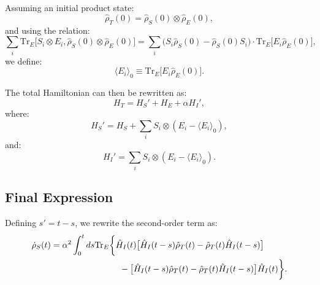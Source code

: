 Assuming an initial product state:
\begin{equation}
    \hat{\rho}_T(0) = \hat{\rho}_S(0) \otimes \hat{\rho}_E(0),
    \label{eq:Initial_Product_State}
\end{equation}
and using the relation:
\begin{equation}
    \sum_i \mathrm{Tr}_E\big[ S_i \otimes E_i , \hat{\rho}_S(0) \otimes \hat{\rho}_E(0)\big] = \sum_i \big(S_i \hat{\rho}_S(0) - \hat{\rho}_S(0) S_i\big) \cdot \mathrm{Tr}_E \big[E_i \hat{\rho}_E(0)\big],
    \label{eq:Trace_Relation}
\end{equation}
we define:
\begin{equation}
    \langle E_i \rangle_0 \equiv \mathrm{Tr}_E \big[E_i \hat{\rho}_E(0)\big].
    \label{eq:Environment_Expectation_Value}
\end{equation}

The total Hamiltonian can then be rewritten as:
\begin{equation}
    H_T = H_S' + H_E + \alpha H_I',
    \label{eq:Shifted_Total_Hamiltonian}
\end{equation}
where:
\begin{equation}
    H_S' = H_S + \sum_i S_i \otimes (E_i - \langle E_i \rangle_0),
    \label{eq:Shifted_System_Hamiltonian}
\end{equation}
and:
\begin{equation}
    H_I' = \sum_i S_i \otimes (E_i - \langle E_i \rangle_0).
    \label{eq:Shifted_Interaction_Hamiltonian}
\end{equation}


\subsection{Final Expression}
\label{subsec:Final_Expression}

Defining $s' = t - s$, we rewrite the second-order term as:
\begin{align}
    \dot{\rho}_S(t) &= \alpha^2 \int_0^t ds \mathrm{Tr}_E \bigg\{ 
        \hat{H}_I(t) \big[ \hat{H}_I(t-s) \hat{\rho}_T(t)  - \hat{\rho}_T(t) \hat{H}_I(t-s) \big] \notag \\ 
        &\qquad \qquad \qquad \qquad - \big[ \hat{H}_I(t-s) \hat{\rho}_T(t)  - \hat{\rho}_T(t) \hat{H}_I(t-s) \big] \hat{H}_I(t) 
    \bigg\}.
    \label{eq:Second_Order_Final_Expression}
\end{align}

